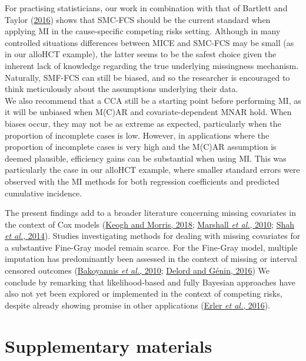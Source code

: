 \documentclass[
  letterpaper,
  DIV=11,
  numbers=noendperiod]{scrreprt}
\begin{document}
For practising statisticians, our work in combination with that of
Bartlett and Taylor
(\protect\hyperlink{ref-bartlettMissingCovariatesCompeting2016}{2016})
shows that SMC-FCS should be the current standard when applying MI in
the cause-specific competing risks setting. Although in many controlled
situations differences between MICE and SMC-FCS may be small (as in our
alloHCT example), the latter seems to be the safest choice given the
inherent lack of knowledge regarding the true underlying missingness
mechanism. Naturally, SMF-FCS can still be biased, and so the researcher
is encouraged to think meticulously about the assumptions underlying
their data.\\
We also recommend that a CCA still be a starting point before performing
MI, as it will be unbiased when M(C)AR and covariate-dependent MNAR
hold. When biases occur, they may not be as extreme as expected,
particularly when the proportion of incomplete cases is low. However, in
applications where the proportion of incomplete cases is very high and
the M(C)AR assumption is deemed plausible, efficiency gains can be
substantial when using MI. This was particularly the case in our alloHCT
example, where smaller standard errors were observed with the MI methods
for both regression coefficients and predicted cumulative incidence.

The present findings add to a broader literature concerning missing
covariates in the context of Cox models
(\protect\hyperlink{ref-keoghMultipleImputationCox2018}{Keogh and
Morris, 2018};
\protect\hyperlink{ref-marshallComparisonImputationMethods2010}{Marshall
\emph{et al.}, 2010};
\protect\hyperlink{ref-shahComparisonRandomForest2014}{Shah \emph{et
al.}, 2014}). Studies investigating methods for dealing with missing
covariates for a substantive Fine-Gray model remain scarce. For the
Fine-Gray model, multiple imputation has predominantly been assessed in
the context of missing or interval censored outcomes
(\protect\hyperlink{ref-bakoyannisModellingCompetingRisks2010}{Bakoyannis
\emph{et al.}, 2010};
\protect\hyperlink{ref-delordMultipleImputationCompeting2016}{Delord and
Génin, 2016}) We conclude by remarking that likelihood-based and fully
Bayesian approaches have also not yet been explored or implemented in
the context of competing risks, despite already showing promise in other
applications
(\protect\hyperlink{ref-erlerDealingMissingCovariates2016}{Erler
\emph{et al.}, 2016}).

\hypertarget{supplementary-materials}{%
\section*{Supplementary materials}\label{supplementary-materials}}
\end{document}
